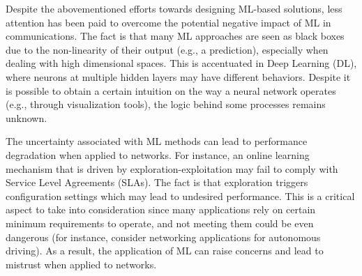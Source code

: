 \documentclass{article}
\begin{document}
	Despite the abovementioned efforts towards designing ML-based solutions, less attention has been paid to overcome the potential negative impact of ML in communications. The fact is that many ML approaches are seen as black boxes due to the non-linearity of their output (e.g., a prediction), especially when dealing with high dimensional spaces. This is accentuated in Deep Learning (DL), where neurons at multiple hidden layers may have different behaviors. Despite it is possible to obtain a certain intuition on the way a neural network operates (e.g., through visualization tools), the logic behind some processes remains unknown.
	
	The uncertainty associated with ML methods can lead to performance degradation when applied to networks. For instance, an online learning mechanism that is driven by exploration-exploitation may fail to comply with Service Level Agreements (SLAs). The fact is that exploration triggers configuration settings which may lead to undesired performance. This is a critical aspect to take into consideration since many applications rely on certain minimum requirements to operate, and not meeting them could be even dangerous (for instance, consider networking applications for autonomous driving). As a result, the application of ML can raise concerns and lead to mistrust when applied to networks.
	
\end{document}
